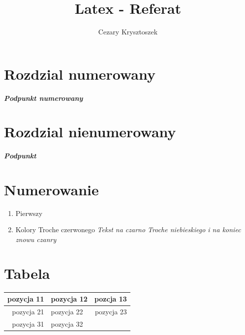 \documentclass[a4paper, 11pt]{article}
\title{Latex - Referat}
\author{Cezary Krysztoszek}
\begin{document}
\maketitle 
\tableofcontents %
\section{Rozdzial numerowany}
\subparagraph{Podpunkt numerowany}

\section*{Rozdzial nienumerowany}
\subparagraph*{Podpunkt}
\section {Numerowanie}
\begin{enumerate}
\item Pierwszy
\item Kolory \newline
{\color{red} Troche czerwonego} \newline %
\emph{Tekst na czarno {\color{blue} Troche niebieskiego} i na koniec znowu czanry}
\end{enumerate}
\section{Tabela}
\begin{tabular}{|r|l r|}  %
  \hline 
  pozycja 11 & pozycja 12 & pozcja 13\\
  \hline
  pozycja 21 & pozycja 22 & pozycja 23 \\
  \hline %
  pozycja 31 & pozycja 32 
  
\end{tabular} 
\end{document}
